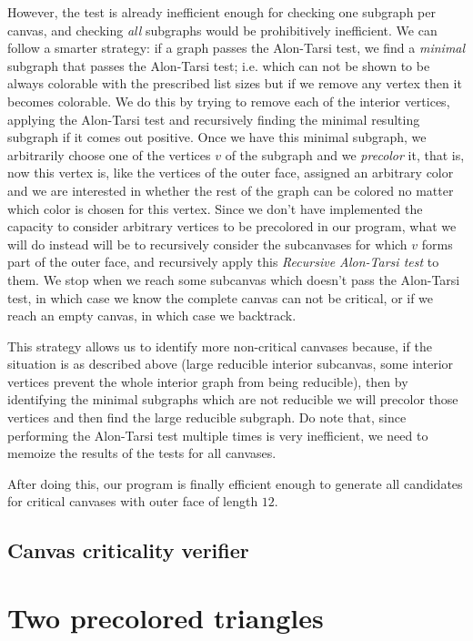 \documentclass{article}
\begin{document}
However, the test is already inefficient enough for checking one subgraph per canvas, and checking \emph{all} subgraphs would be prohibitively inefficient. We can follow a smarter strategy: if a graph passes the Alon-Tarsi test, we find a \emph{minimal} subgraph that passes the Alon-Tarsi test; i.e. which can not be shown to be always colorable with the prescribed list sizes but if we remove any vertex then it becomes colorable. We do this by trying to remove each of the interior vertices, applying the Alon-Tarsi test and recursively finding the minimal resulting subgraph if it comes out positive. Once we have this minimal subgraph, we arbitrarily choose one of the vertices $v$ of the subgraph and we \textit{precolor} it, that is, now this vertex is, like the vertices of the outer face, assigned an arbitrary color and we are interested in whether the rest of the graph can be colored no matter which color is chosen for this vertex. Since we don't have implemented the capacity to consider arbitrary vertices to be precolored in our program, what we will do instead will be to recursively consider the subcanvases for which $v$ forms part of the outer face, and recursively apply this \textit{Recursive Alon-Tarsi test} to them. We stop when we reach some subcanvas which doesn't pass the Alon-Tarsi test, in which case we know the complete canvas can not be critical, or if we reach an empty canvas, in which case we backtrack.

This strategy allows us to identify more non-critical canvases because, if the situation is as described above (large reducible interior subcanvas, some interior vertices prevent the whole interior graph from being reducible), then by identifying the minimal subgraphs which are not reducible we will precolor those vertices and then find the large reducible subgraph. Do note that, since performing the Alon-Tarsi test multiple times is very inefficient, we need to memoize the results of the tests for all canvases. 

After doing this, our program is finally efficient enough to generate all candidates for critical canvases with outer face of length $12$.

\subsection{Canvas criticality verifier}

\section{Two precolored triangles}
\end{document}
